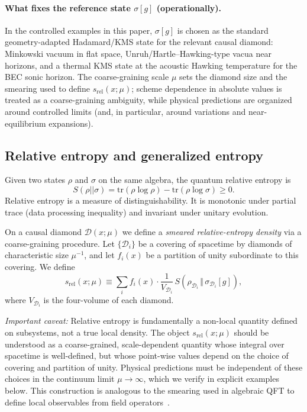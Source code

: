 \documentclass[aps,prd,twocolumn,superscriptaddress,nofootinbib,floatfix]{revtex4-2}
\newcommand{\Ddom}{\mathcal{D}}
\newcommand{\sr}{s_{\mathrm{rel}}}
\begin{document}
\paragraph{What fixes the reference state $\sigma[g]$ (operationally).}
In the controlled examples in this paper, $\sigma[g]$ is chosen as the standard geometry-adapted Hadamard/KMS state for the relevant causal diamond: Minkowski vacuum in flat space, Unruh/Hartle--Hawking-type vacua near horizons, and a thermal KMS state at the acoustic Hawking temperature for the BEC sonic horizon.
The coarse-graining scale $\mu$ sets the diamond size and the smearing used to define $s_{\mathrm{rel}}(x;\mu)$; scheme dependence in absolute values is treated as a coarse-graining ambiguity, while physical predictions are organized around controlled limits (and, in particular, around variations and near-equilibrium expansions).

\subsection{Relative entropy and generalized entropy}

Given two states $\rho$ and $\sigma$ on the same algebra, the quantum relative entropy is
\begin{equation}
    S(\rho||\sigma) = \mathrm{tr}(\rho \log \rho) - \mathrm{tr}(\rho \log \sigma) \ge 0.
\end{equation}
Relative entropy is a measure of distinguishability. It is monotonic under partial trace (data processing inequality) and invariant under unitary evolution.

On a causal diamond $\Ddom(x;\mu)$ we define a \emph{smeared relative-entropy density} via a coarse-graining procedure. Let $\{\Ddom_i\}$ be a covering of spacetime by diamonds of characteristic size $\mu^{-1}$, and let $f_i(x)$ be a partition of unity subordinate to this covering. We define
\begin{equation}
    \sr(x;\mu)
    \equiv
    \sum_i f_i(x) \cdot \frac{1}{V_{\Ddom_i}}\,
    S\!\left(\rho_{\Ddom_i} \,\big\Vert\, \sigma_{\Ddom_i}[g]\right),
    \label{eq:sr-def}
\end{equation}
where $V_{\Ddom_i}$ is the four-volume of each diamond.

\emph{Important caveat:} Relative entropy is fundamentally a non-local quantity defined on subsystems, not a true local density. The object $\sr(x;\mu)$ should be understood as a coarse-grained, scale-dependent quantity whose integral over spacetime is well-defined, but whose point-wise values depend on the choice of covering and partition of unity. Physical predictions must be independent of these choices in the continuum limit $\mu \to \infty$, which we verify in explicit examples below. This construction is analogous to the smearing used in algebraic QFT to define local observables from field operators~\cite{Haag1992}.
\end{document}

